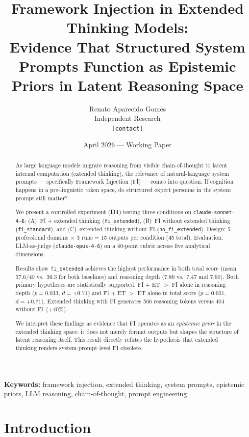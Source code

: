 \documentclass[11pt,a4paper]{article}
\title{%
  \textbf{Framework Injection in Extended Thinking Models:}\\
  \large Evidence That Structured System Prompts Function as Epistemic Priors
  in Latent Reasoning Space
}
\author{
  Renato Aparecido Gomes\\
  \small Independent Research\\
  \small \texttt{[contact]}
}
\date{April 2026 — Working Paper}
\begin{document}
\maketitle
\thispagestyle{empty}

\begin{abstract}
As large language models migrate reasoning from visible chain-of-thought to
latent internal computation (extended thinking), the relevance of natural-language
system prompts — specifically Framework Injection (FI) — comes into question.
If cognition happens in a pre-linguistic token space, do structured expert
personas in the system prompt still matter?

We present a controlled experiment (\textbf{D1}) testing three conditions on
\texttt{claude-sonnet-4-6}: (A)~FI + extended thinking (\texttt{fi\_extended}),
(B)~FI without extended thinking (\texttt{fi\_standard}), and (C)~extended
thinking without FI (\texttt{no\_fi\_extended}). Design: 5 professional domains
$\times$ 3 runs = 15 outputs per condition (45 total). Evaluation: LLM-as-judge
(\texttt{claude-opus-4-6}) on a 40-point rubric across five analytical dimensions.

Results show \texttt{fi\_extended} achieves the highest performance in both
total score (mean 37.6/40 vs.\ 36.3 for both baselines) and reasoning depth
(7.80 vs.\ 7.47 and 7.60). Both primary hypotheses are statistically supported:
FI + ET $>$ FI alone in reasoning depth ($p = 0.033$, $d = +0.71$) and
FI + ET $>$ ET alone in total score ($p = 0.031$, $d = +0.71$).
Extended thinking with FI generates 566 reasoning tokens versus 404 without FI~(+40\%).

We interpret these findings as evidence that FI operates as an \emph{epistemic
prior} in the extended thinking space: it does not merely format outputs but
shapes the structure of latent reasoning itself. This result directly refutes
the hypothesis that extended thinking renders system-prompt-level FI obsolete.
\end{abstract}

\vspace{0.5em}
\noindent\textbf{Keywords:} framework injection, extended thinking, system prompts,
epistemic priors, LLM reasoning, chain-of-thought, prompt engineering

\section{Introduction}
\end{document}
